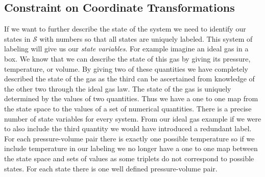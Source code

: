 \documentclass{article}
\begin{document}
\subsection{Constraint on Coordinate Transformations}	

	
	If we want to further describe the state of the system we need to identify our states in $\mathcal{S}$ with numbers so that all states are uniquely labeled. This system of labeling will give us our \textit{state variables}. For example imagine an ideal gas in a box. We know that we can describe the state of this gas by giving its pressure, temperature, or volume. By giving two of these quantities we have completely described the state of the gas as the third can be ascertained from knowledge of the other two through the ideal gas law. The state of the gas is uniquely determined by the values of two quantities. Thus we have a one to one map from the state space to the values of a set of numerical quantities. There is a precise number of state variables for every system. From our ideal gas example if we were to also include the third quantity we would have introduced a redundant label. For each pressure-volume pair there is exactly one possible temperature so if we include temperature in our labeling we no longer have a one to one map between the state space and sets of values as some triplets do not correspond to possible states. For each state there is one well defined pressure-volume pair. 
\end{document}
